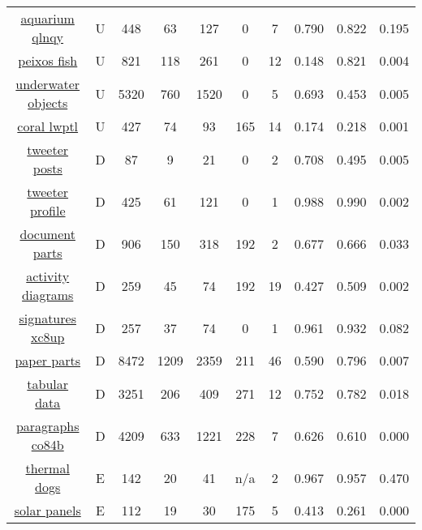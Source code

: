 \begin{longtable}{|| c | c | c c c | c c | c c c ||}
\cline{1-10}
\href{https://app.roboflow.com/roboflow-100/aquarium-qlnqy/1}{aquarium qlnqy} & U & 448 & 63 & 127 & 0 & 7 & 0.790 & 0.822 & 0.195 \\
\cline{1-10}
\href{https://app.roboflow.com/roboflow-100/peixos-fish/3}{peixos fish} & U & 821 & 118 & 261 & 0 & 12 & 0.148 & 0.821 & 0.004 \\
\cline{1-10}
\href{https://app.roboflow.com/roboflow-100/underwater-objects-5v7p8/1}{underwater objects} & U & 5320 & 760 & 1520 & 0 & 5 & 0.693 & 0.453 & 0.005 \\
\cline{1-10}
\href{https://app.roboflow.com/roboflow-100/coral-lwptl/1}{coral lwptl} & U & 427 & 74 & 93 & 165 & 14 & 0.174 & 0.218 & 0.001 \\
\cline{1-10}
\href{https://app.roboflow.com/roboflow-100/tweeter-posts/1}{tweeter posts} & D & 87 & 9 & 21 & 0 & 2 & 0.708 & 0.495 & 0.005 \\
\cline{1-10}
\href{https://app.roboflow.com/roboflow-100/tweeter-profile/1}{tweeter profile} & D & 425 & 61 & 121 & 0 & 1 & 0.988 & 0.990 & 0.002 \\
\cline{1-10}
\href{https://app.roboflow.com/roboflow-100/document-parts/1}{document parts} & D & 906 & 150 & 318 & 192 & 2 & 0.677 & 0.666 & 0.033 \\
\cline{1-10}
\href{https://app.roboflow.com/roboflow-100/activity-diagrams-qdobr/1}{activity diagrams} & D & 259 & 45 & 74 & 192 & 19 & 0.427 & 0.509 & 0.002 \\
\cline{1-10}
\href{https://app.roboflow.com/roboflow-100/signatures-xc8up/1}{signatures xc8up} & D & 257 & 37 & 74 & 0 & 1 & 0.961 & 0.932 & 0.082 \\
\cline{1-10}
\href{https://app.roboflow.com/roboflow-100/paper-parts/3}{paper parts} & D & 8472 & 1209 & 2359 & 211 & 46 & 0.590 & 0.796 & 0.007 \\
\cline{1-10}
\href{https://app.roboflow.com/roboflow-100/tabular-data-wf9uh/1}{tabular data} & D & 3251 & 206 & 409 & 271 & 12 & 0.752 & 0.782 & 0.018 \\
\cline{1-10}
\href{https://app.roboflow.com/roboflow-100/paragraphs-co84b/1}{paragraphs co84b} & D & 4209 & 633 & 1221 & 228 & 7 & 0.626 & 0.610 & 0.000 \\
\cline{1-10}
\href{https://app.roboflow.com/roboflow-100/thermal-dogs-and-people-x6ejw/1}{thermal dogs} & E & 142 & 20 & 41 & n/a & 2 & 0.967 & 0.957 & 0.470 \\
\cline{1-10}
\href{https://app.roboflow.com/roboflow-100/solar-panels-taxvb/1}{solar panels} & E & 112 & 19 & 30 & 175 & 5 & 0.413 & 0.261 & 0.000 \\

\end{longtable}
